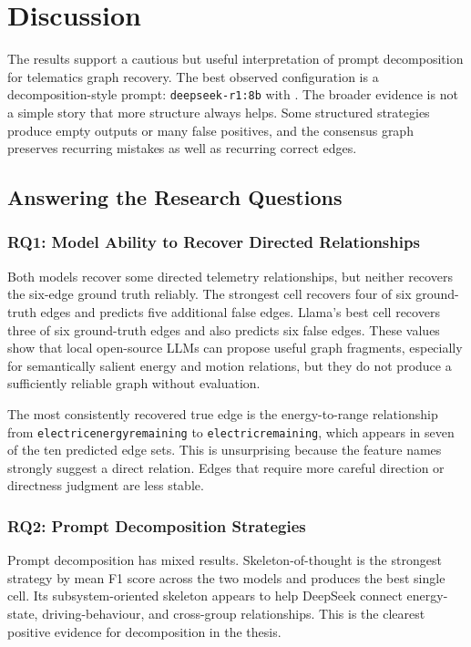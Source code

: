 \chapter{Discussion}
\label{sec:discussion}

The results support a cautious but useful interpretation of prompt
decomposition for telematics graph recovery. The best observed configuration
is a decomposition-style prompt: \texttt{deepseek-r1:8b} with
. The broader evidence is not a
simple story that more structure always helps. Some structured strategies
produce empty outputs or many false positives, and the consensus graph
preserves recurring mistakes as well as recurring correct edges.

\section{Answering the Research Questions}

\subsection{RQ1: Model Ability to Recover Directed Relationships}

Both models recover some directed telemetry relationships, but neither
recovers the six-edge ground truth reliably. The strongest cell recovers four
of six ground-truth edges and predicts five additional false edges. Llama's
best cell recovers three of six ground-truth edges and also predicts six false
edges. These values show that local open-source LLMs can propose useful graph
fragments, especially for semantically salient energy and motion relations,
but they do not produce a sufficiently reliable graph without evaluation.

The most consistently recovered true edge is the energy-to-range relationship
from \texttt{electricenergyremaining} to \texttt{electricremaining}, which
appears in seven of the ten predicted edge sets. This is unsurprising because
the feature names strongly suggest a direct relation. Edges that require more
careful direction or directness judgment are less stable.

\subsection{RQ2: Prompt Decomposition Strategies}

Prompt decomposition has mixed results. Skeleton-of-thought is the strongest
strategy by mean F1 score across the two models and produces the best single
cell. Its subsystem-oriented skeleton appears to help DeepSeek connect
energy-state, driving-behaviour, and cross-group relationships. This is the
clearest positive evidence for decomposition in the thesis.

